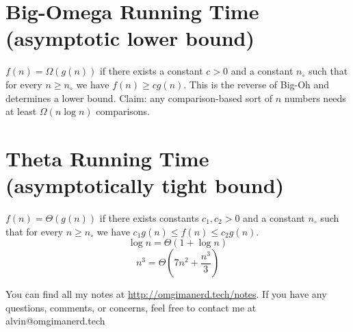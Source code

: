 \documentclass[letterpaper, 12pt]{math}
\begin{document}
\section*{Big-Omega Running Time (asymptotic lower bound)}
\( f(n) = \Omega(g(n)) \) if there exists a constant \( c > 0 \) and a constant
\( n_{\circ} \) such that for every \( n \geq n_{\circ} \) we have
\( f(n) \geq cg(n) \). This is the reverse of Big-Oh and determines a lower
bound. Claim: any comparison-based sort of \( n \) numbers needs at least
\( \Omega(n\log n) \) comparisons.

\section*{Theta Running Time (asymptotically tight bound)}
\( f(n) = \Theta(g(n)) \) if there exists constants \( c_{1},c_{2} > 0 \) and
a constant \( n_{\circ} \) such that for every \( n \geq n_{\circ} \) we have
\( c_{1}g(n) \leq f(n) \leq c_{2}g(n) \).
\[ \log n = \Theta(1+\log n) \]
\[ n^3 = \Theta(7n^2+\frac{n^3}{3}) \]

\begin{center}
  You can find all my notes at \url{http://omgimanerd.tech/notes}. If you have
  any questions, comments, or concerns, feel free to contact me at
  alvin@omgimanerd.tech
\end{center}
\end{document}
